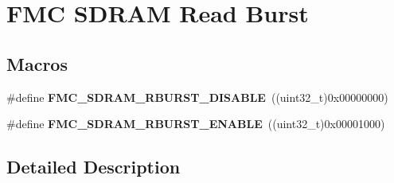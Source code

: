 \hypertarget{group___f_m_c___s_d_r_a_m___read___burst}{}\section{F\+MC S\+D\+R\+AM Read Burst}
\label{group___f_m_c___s_d_r_a_m___read___burst}
\subsection*{Macros}
\begin{DoxyCompactItemize}
\item 
\#define {\bfseries F\+M\+C\+\_\+\+S\+D\+R\+A\+M\+\_\+\+R\+B\+U\+R\+S\+T\+\_\+\+D\+I\+S\+A\+B\+LE}~((uint32\+\_\+t)0x00000000)\hypertarget{group___f_m_c___s_d_r_a_m___read___burst_ga8e364aed581a0c376a24e61201f1174d}{}\label{group___f_m_c___s_d_r_a_m___read___burst_ga8e364aed581a0c376a24e61201f1174d}

\item 
\#define {\bfseries F\+M\+C\+\_\+\+S\+D\+R\+A\+M\+\_\+\+R\+B\+U\+R\+S\+T\+\_\+\+E\+N\+A\+B\+LE}~((uint32\+\_\+t)0x00001000)\hypertarget{group___f_m_c___s_d_r_a_m___read___burst_ga1cdc6394b8810cf1643f2745bb4799b3}{}\label{group___f_m_c___s_d_r_a_m___read___burst_ga1cdc6394b8810cf1643f2745bb4799b3}

\end{DoxyCompactItemize}


\subsection{Detailed Description}

